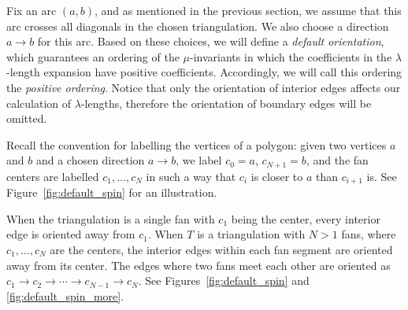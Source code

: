 \documentclass[11pt]{article}
\numberwithin{equation}{section}
\numberwithin{equation}{section}
\begin{document}
{Fix an arc $(a,b)$, and as mentioned in the previous section, we assume that this arc crosses all diagonals in the chosen triangulation.
We also choose a direction $a \to b$ for this arc.}
Based on these choices, we will define a \emph{default orientation}, which guarantees an ordering of the $\mu$-invariants
in which the coefficients in the $\lambda$-length expansion have positive coefficients.
Accordingly, we will call this ordering the \emph{positive ordering}.
Notice that only the orientation of interior edges affects our calculation of $\lambda$-lengths, therefore the orientation of boundary edges will be omitted.

Recall the convention for labelling the vertices of a polygon: given two vertices $a$ and $b$ and a chosen
direction $a \to b$, we label $c_0 = a$, $c_{N+1} = b$, and the fan centers are labelled $c_1,\dots,c_N$ in such a way that $c_i$
is closer to $a$ than $c_{i+1}$ is. See Figure~\ref{fig:default_spin} for an illustration.

\begin{Definition}\rm
 When the triangulation is a single fan with $c_1$ being the center, every interior edge is oriented away from $c_1$.
 When $T$ is a triangulation with $N>1$ fans, where $c_1,\dots,c_N$ are the centers, the interior edges within each fan segment are oriented away
 from its center. The edges where two fans meet each other are oriented as
 \( c_1\rightarrow c_2\rightarrow\cdots\rightarrow c_{N-1}\rightarrow c_N \).
 See Figures~\ref{fig:default_spin} and \ref{fig:default_spin_more}.
\end{Definition}
\end{document}
